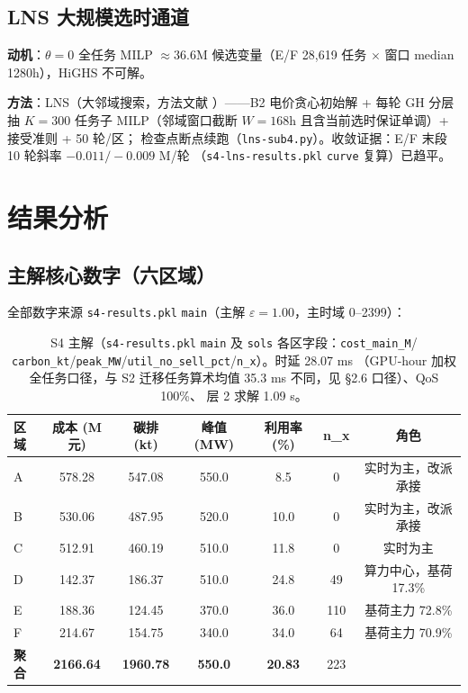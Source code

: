 \documentclass{internal-report}
\begin{document}
\subsection{LNS 大规模选时通道}
\label{sec:lns}

\textbf{动机}：$\theta{=}0$ 全任务 MILP $\approx 36.6$M 候选变量（E/F 28{,}619 任务 $\times$ 窗口
median 1280h），HiGHS 不可解。

\textbf{方法}：LNS（大邻域搜索，方法文献 \cite{shaw1998}）——B2 电价贪心初始解 + 每轮 GH 分层抽
$K{=}300$ 任务子 MILP（邻域窗口截断 $W{=}168$h 且含当前选时保证单调）+ 接受准则 + 50 轮/区；
检查点断点续跑（\texttt{lns-sub4.py}）。收敛证据：E/F 末段 10 轮斜率 $-0.011/-0.009$ M/轮
（\texttt{s4-lns-results.pkl} \texttt{curve} 复算）已趋平。

\section{结果分析}
\label{sec:result}

\subsection{主解核心数字（六区域）}
\label{sec:main}

全部数字来源 \texttt{s4-results.pkl} \texttt{main}（主解 $\varepsilon{=}1.00$，主时域 0--2399）：

\begin{table}[H]
\centering
\footnotesize
\begin{tabular}{lcccccc}
\toprule
区域 & 成本 (M元) & 碳排 (kt) & 峰值 (MW) & 利用率 (\%) & n\_x & 角色 \\
\midrule
A & 578.28 & 547.08 & 550.0 & 8.5 & 0 & 实时为主，改派承接 \\
B & 530.06 & 487.95 & 520.0 & 10.0 & 0 & 实时为主，改派承接 \\
C & 512.91 & 460.19 & 510.0 & 11.8 & 0 & 实时为主 \\
D & 142.37 & 186.37 & 510.0 & 24.8 & 49 & 算力中心，基荷 17.3\% \\
E & 188.36 & 124.45 & 370.0 & 36.0 & 110 & 基荷主力 72.8\% \\
F & 214.67 & 154.75 & 340.0 & 34.0 & 64 & 基荷主力 70.9\% \\
\midrule
\textbf{聚合} & \textbf{2166.64} & \textbf{1960.78} & \textbf{550.0} & \textbf{20.83} & 223 & \\
\bottomrule
\end{tabular}
\caption{S4 主解（\texttt{s4-results.pkl} \texttt{main} 及 \texttt{sols} 各区字段：\texttt{cost\_main\_M}/
\texttt{carbon\_kt}/\texttt{peak\_MW}/\texttt{util\_no\_sell\_pct}/\texttt{n\_x}）。时延 28.07 ms
（GPU-hour 加权全任务口径，与 S2 迁移任务算术均值 35.3 ms 不同，见 §2.6 口径）、QoS 100\%、
层 2 求解 1.09 s。}
\label{tab:main}
\end{table}
\end{document}

